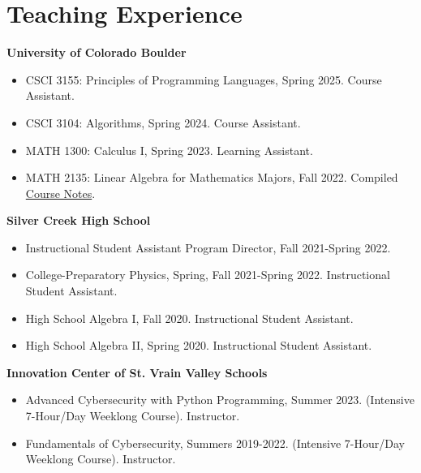 \documentclass[a4paper,20pt]{article}
\begin{document}
    \section{Teaching Experience}
      \textbf{University of Colorado Boulder}
      \begin{itemize}
        \vspace{-5pt}
        \item CSCI 3155: Principles of Programming Languages, Spring 2025. Course Assistant.
        \vspace{-5pt}
        \item CSCI 3104: Algorithms, Spring 2024. Course Assistant.
        \vspace{-5pt}
        \item MATH 1300: Calculus I, Spring 2023. Learning Assistant.
        \vspace{-5pt}
        \item MATH 2135: Linear Algebra for Mathematics Majors, Fall 2022. Compiled \href{https://officialadithya.github.io/assets/pdf/course_materials/linearalgebra.pdf}{Course Notes}.
        \vspace{-5pt}
      \end{itemize}
      \textbf{Silver Creek High School}
      \begin{itemize}
          \vspace{-5pt}
          \item Instructional Student Assistant Program Director, Fall 2021-Spring 2022.
          \vspace{-5pt}
          \item College-Preparatory Physics, Spring, Fall 2021-Spring 2022. Instructional Student Assistant. 
          \vspace{-5pt}
          \item High School Algebra I, Fall 2020. Instructional Student Assistant. 
          \vspace{-5pt}
          \item High School Algebra II, Spring 2020. Instructional Student Assistant.
          \vspace{-5pt}
        \end{itemize}
        \textbf{Innovation Center of St. Vrain Valley Schools}
        \begin{itemize}
          \vspace{-5pt}
          \item Advanced Cybersecurity with Python Programming, Summer 2023. (Intensive 7-Hour/Day Weeklong Course). Instructor.
          \vspace{-5pt}
          \item Fundamentals of Cybersecurity, Summers 2019-2022. (Intensive 7-Hour/Day Weeklong Course). Instructor.
        \end{itemize}
      
\end{document}
